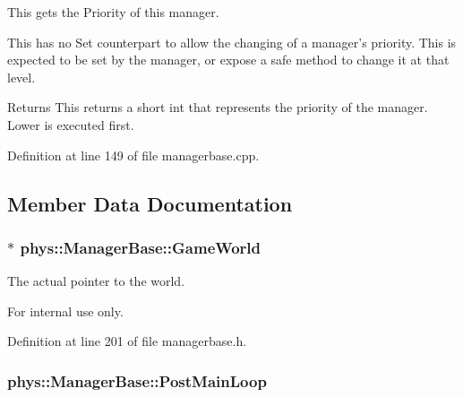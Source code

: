 This gets the Priority of this manager. 

This has no Set counterpart to allow the changing of a manager's priority. This is expected to be set by the manager, or expose a safe method to change it at that level. \begin{DoxyReturn}{Returns}
This returns a short int that represents the priority of the manager. Lower is executed first. 
\end{DoxyReturn}


Definition at line 149 of file managerbase.cpp.



\subsection{Member Data Documentation}
\hypertarget{classphys_1_1ManagerBase_ae2f158b4b2fef1bf2bee2524e0236c7b}{
\subsubsection[{GameWorld}]{$\ast$ {\bf phys::ManagerBase::GameWorld}}}
\label{d2/de3/classphys_1_1ManagerBase_ae2f158b4b2fef1bf2bee2524e0236c7b}


The actual pointer to the world. 

\begin{DoxyInternal}{For internal use only.}
\end{DoxyInternal}


Definition at line 201 of file managerbase.h.

\hypertarget{classphys_1_1ManagerBase_aa1e80a30f151c07e06d1f4650f315da5}{
\subsubsection[{PostMainLoop}]{ {\bf phys::ManagerBase::PostMainLoop}}}
\label{d2/de3/classphys_1_1ManagerBase_aa1e80a30f151c07e06d1f4650f315da5}


